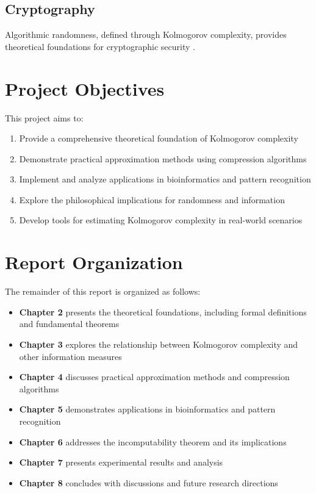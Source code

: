 \documentclass[12pt,a4paper]{report}
\begin{document}
\subsection{Cryptography}
Algorithmic randomness, defined through Kolmogorov complexity, provides theoretical foundations for cryptographic security \cite{barak2011computational}.

\section{Project Objectives}

This project aims to:

\begin{enumerate}
    \item Provide a comprehensive theoretical foundation of Kolmogorov complexity
    \item Demonstrate practical approximation methods using compression algorithms
    \item Implement and analyze applications in bioinformatics and pattern recognition
    \item Explore the philosophical implications for randomness and information
    \item Develop tools for estimating Kolmogorov complexity in real-world scenarios
\end{enumerate}

\section{Report Organization}

The remainder of this report is organized as follows:

\begin{itemize}
    \item \textbf{Chapter 2} presents the theoretical foundations, including formal definitions and fundamental theorems
    \item \textbf{Chapter 3} explores the relationship between Kolmogorov complexity and other information measures
    \item \textbf{Chapter 4} discusses practical approximation methods and compression algorithms
    \item \textbf{Chapter 5} demonstrates applications in bioinformatics and pattern recognition
    \item \textbf{Chapter 6} addresses the incomputability theorem and its implications
    \item \textbf{Chapter 7} presents experimental results and analysis
    \item \textbf{Chapter 8} concludes with discussions and future research directions
\end{itemize}
\end{document}
